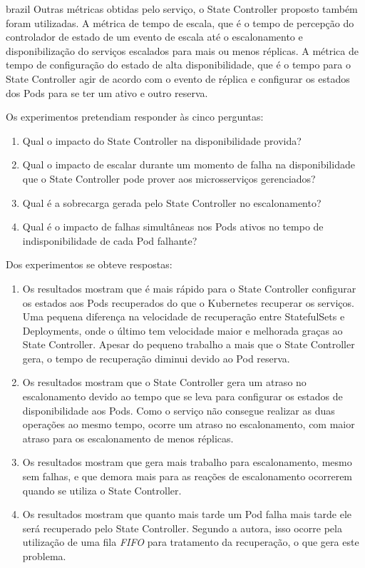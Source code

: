 \begin{otherlanguage*}{brazil}
Outras métricas obtidas pelo serviço, o State Controller proposto também
foram utilizadas. A métrica de tempo de escala, que é o tempo de percepção
do controlador de estado de um evento de escala até o escalonamento e
disponibilização do serviços escalados para mais ou menos réplicas. A métrica
de tempo de configuração do estado de alta disponibilidade, que é o tempo
para o State Controller agir de acordo com o evento de réplica e configurar
os estados dos Pods para se ter um ativo e outro reserva.

Os experimentos pretendiam responder às cinco perguntas:

\begin{enumerate}
    \item Qual o impacto do State Controller na disponibilidade provida?
    \item Qual o impacto de escalar durante um momento de falha na
    disponibilidade que o State Controller pode prover aos microsserviços
    gerenciados?
    \item Qual é a sobrecarga gerada pelo State Controller no escalonamento?
    \item Qual é o impacto de falhas simultâneas nos Pods ativos no tempo de
    indisponibilidade de cada Pod falhante?
\end{enumerate}

Dos experimentos se obteve respostas:

\begin{enumerate}
    \item Os resultados mostram que é mais rápido para o State Controller
    configurar os estados aos Pods recuperados do que o Kubernetes recuperar
    os serviços. Uma pequena diferença na velocidade de recuperação entre
    StatefulSets e Deployments, onde o último tem velocidade maior e melhorada
    graças ao State Controller. Apesar do pequeno trabalho a mais que o State
    Controller gera, o tempo de recuperação diminui devido ao Pod reserva.
    \item Os resultados mostram que o State Controller gera um atraso no
    escalonamento devido ao tempo que se leva para configurar os estados de
    disponibilidade aos Pods. Como o serviço não consegue realizar as duas
    operações ao mesmo tempo, ocorre um atraso no escalonamento, com maior atraso
    para os escalonamento de menos réplicas.
    \item Os resultados mostram que gera mais trabalho para escalonamento, mesmo
    sem falhas, e que demora mais para as reações de escalonamento ocorrerem
    quando se utiliza o State Controller.
    \item Os resultados mostram que quanto mais tarde um Pod falha mais tarde ele
    será recuperado pelo State Controller. Segundo a autora, isso ocorre pela
    utilização de uma fila \textit{FIFO} para tratamento da recuperação, o que
    gera este problema.
\end{enumerate}


\end{otherlanguage*}
